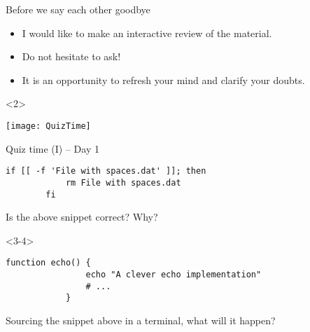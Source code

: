 
\begin{frame}{Before we say each other goodbye}
    \begin{itemize}
        \item I would like to make an interactive review of the material.
        \item Do not hesitate to ask!
        \item It is an opportunity to refresh your mind and clarify your doubts.
    \end{itemize}
    \vspace{5mm}
    \begin{uncoverenv}<2>
        \centerline{\texttt{[image: QuizTime]}}
    \end{uncoverenv}
\end{frame}
\begin{frame}[fragile]{Quiz time (I) -- Day 1}
    \vspace{-3mm}
    \begin{lstlisting}[style=myBash, numbers=none]
        if [[ -f 'File with spaces.dat' ]]; then
            rm File with spaces.dat
        fi
    \end{lstlisting}
    \begin{quiz}[1]{Is the above snippet correct? Why?}
    \end{quiz}
    \begin{uncoverenv}<3-4>
        \begin{lstlisting}[style=myBash, numbers=none]
            function echo() {
                echo "A clever echo implementation"
                # ...
            }
        \end{lstlisting}
        \begin{quiz}[3]{Sourcing the snippet above in a terminal, what will it happen?}
        \end{quiz}
    \end{uncoverenv}
\end{frame}
